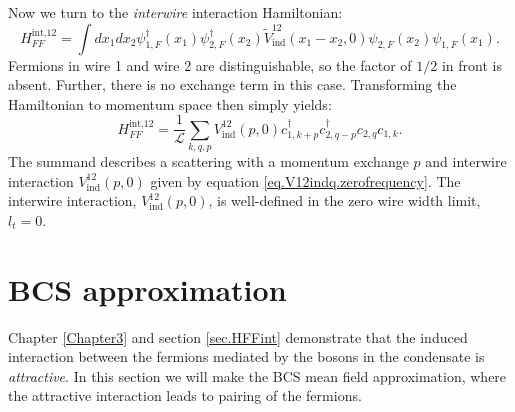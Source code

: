 Now we turn to the \textit{interwire} interaction Hamiltonian:
\begin{equation}
H^\text{int,12}_{FF} = \int dx_1 dx_2 \psi^\dagger_{1,F}(x_1)\psi^\dagger_{2,F}(x_2) \tilde{V}_{\text{ind}}^{12}(x_1 - x_2,0) \psi_{2,F}(x_2)\psi_{1,F}(x_1).
\label{eq.Hint12realspace}
\end{equation}
Fermions in wire 1 and wire 2 are distinguishable, so the factor of $1/2$ in front is absent. Further, there is no exchange term in this case. Transforming the Hamiltonian to momentum space then simply yields:
\begin{equation}
H^\text{int,12}_{FF} = \frac{1}{\mathcal{L}}\sum_{k,q,p} V_{\text{ind}}^{12}(p, 0) c^\dagger_{1,k + p} c^\dagger_{2, q - p} c_{2, q} c_{1, k}. 
\label{eq.Hint12momentumspace}
\end{equation}
The summand describes a scattering with a momentum exchange $p$ and interwire interaction $V_{\text{ind}}^{12}(p,0)$ given by equation \eqref{eq.V12indq.zerofrequency}. The interwire interaction, $V_{\text{ind}}^{12}(p,0)$, is well-defined in the zero wire width limit, $l_t = 0$. 

\section{BCS approximation} \label{sec.meanfieldapproximation}
Chapter \ref{Chapter3} and section \ref{sec.HFFint} demonstrate that the induced interaction between the fermions mediated by the bosons in the condensate is \textit{attractive}. In this section we will make the BCS mean field approximation, where the attractive interaction leads to pairing of the fermions. 

